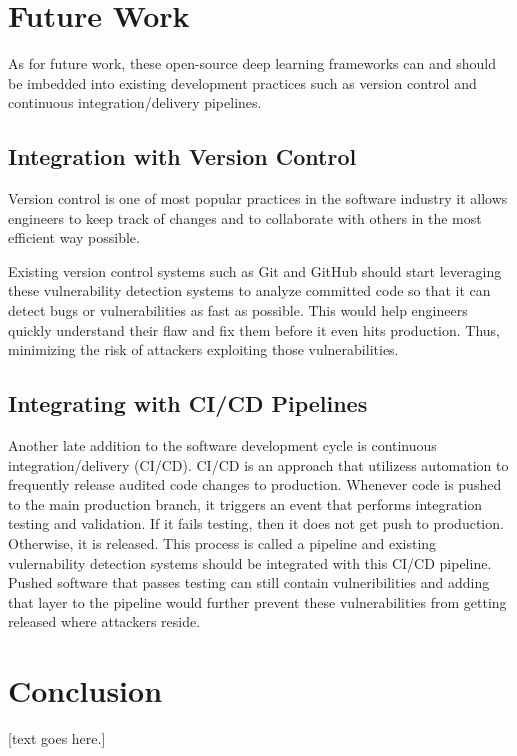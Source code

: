 \documentclass[12pt,twocolumn,letterpaper]{article}
\begin{document}
\section{Future Work}
\label{sec:future-work}

As for future work, these open-source deep learning frameworks can and should be imbedded into existing 
development practices such as version control and continuous integration/delivery pipelines.

\subsection{Integration with Version Control}
\label{sub:integrating-with-version-control}

Version control is one of most popular practices in the software industry it allows engineers to keep track 
of changes and to collaborate with others in the most efficient way possible. 

Existing version control systems such as Git \cite{Torvalds05} and GitHub \cite{Werner08} should start leveraging these vulnerability 
detection systems to analyze committed code so that it can detect bugs or vulnerabilities as fast as 
possible. This would help engineers quickly understand their flaw and fix them before it even hits production.
Thus, minimizing the risk of attackers exploiting those vulnerabilities.

\subsection{Integrating with CI/CD Pipelines}
\label{sub:integrating-with-cicd-pipelines}

Another late addition to the software development cycle is continuous integration/delivery (CI/CD). 
CI/CD is an approach that utilizess automation to frequently release audited code changes to production. 
Whenever code is pushed to the main production branch, it triggers an event that performs integration 
testing and validation. If it fails testing, then it does not get push to production. Otherwise, it is 
released. This process is called a pipeline and existing vulernability detection systems should be integrated 
with this CI/CD pipeline. Pushed software that passes testing can still contain vulneribilities and adding 
that layer to the pipeline would further prevent these vulnerabilities from getting released where attackers 
reside.

\section{Conclusion}
\label{sec:conclusion}
[text goes here.]

{\small


}
\end{document}
